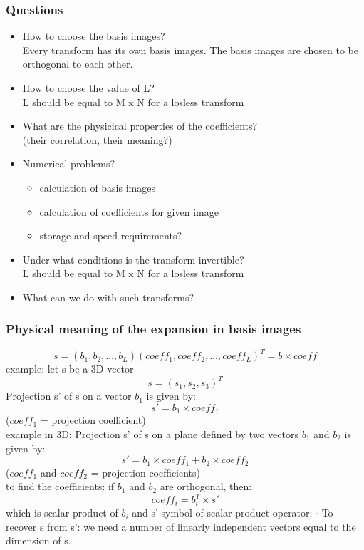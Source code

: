 \documentclass{article}
\begin{document}
\subsubsection{Questions}
\begin{itemize}
    \item How to choose the basis images? \\ Every transform has its own basis images. The basis images are chosen to be orthogonal to each other.
    \item How to choose the value of L? \\ L should be equal to M x N for a losless transform
    \item What are the physicical properties of the coefficients? \\ (their correlation, their meaning?)
    \item Numerical problems? \\ \begin{itemize}
        \item calculation of basis images
        \item calculation of coefficients for given image
        \item storage and speed requirements?
    \end{itemize}
    \item Under what conditions is the transform invertible? \\ L should be equal to M x N for a losless transform
    \item What can we do with such transforms?
\end{itemize}
\subsubsection{Physical meaning of the expansion in basis images}
\begin{equation}
    s = (b_1, b_2, \dots, b_L)(coeff_1, coeff_2, \dots, coeff_L)^T = b \times coeff
\end{equation}
example: let s be a 3D vector \begin{equation}
    s = (s_1, s_2, s_3)^T
\end{equation}
Projection s' of s on a vector $b_1$ is given by: 
\begin{equation}
    s' = b_1 \times coeff_1 
\end{equation}
($coeff_1$ = projection coefficient) \\
example in 3D:
Projection s' of s on a plane defined by two vectors $b_1$ and $b_2$ is given by:
\begin{equation}
    s' = b_1 \times coeff_1 + b_2 \times coeff_2
\end{equation}
($coeff_1$ and $coeff_2$ = projection coefficients) \\
to find the coefficients:
if $b_1$ and $b_2$ are orthogonal, then:
\begin{equation}
    coeff_i = b_i^T \times s'
\end{equation}
which is scalar product of $b_i$ and s' symbol of scalar product operator: $\cdot$
To recover s from s': we need a number of linearly independent vectors equal to the dimension of s. \\
\end{document}
